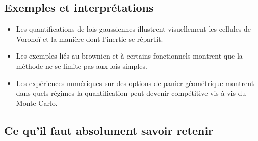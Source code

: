 \documentclass[11pt,a4paper]{article}
\newcommand{\mc}{Monte Carlo}
\begin{document}
\subsection{Exemples et interprétations}

\begin{itemize}
  \item Les quantifications de lois gaussiennes illustrent visuellement les cellules de Voronoï et la manière dont l'inertie se répartit.
  \item Les exemples liés au brownien et à certains fonctionnels montrent que la méthode ne se limite pas aux lois simples.
  \item Les expériences numériques sur des options de panier géométrique montrent dans quels régimes la quantification peut devenir compétitive vis-à-vis du \mc.
\end{itemize}

\subsection{Ce qu'il faut absolument savoir retenir}
\end{document}
